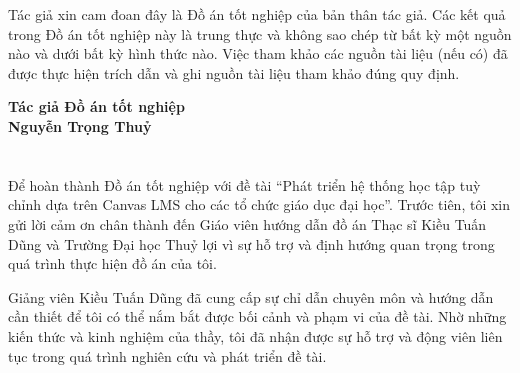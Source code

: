 \documentclass[a4paper,12pt,oneside]{report}
\title{\bf \TITLE}
\author{\AUTHOR}
\theoremstyle{definition}
\begin{document}
\restoregeometry

\restoregeometry

\newpage



\section*{}
\vspace{15pt}


Tác giả xin cam đoan đây là Đồ án tốt nghiệp của bản thân tác giả. Các kết quả trong Đồ án tốt nghiệp này là trung thực và không sao chép từ bất kỳ một nguồn nào và dưới bất kỳ hình thức nào. Việc tham khảo các nguồn tài liệu (nếu có) đã được thực hiện trích dẫn và ghi nguồn tài liệu tham khảo đúng quy định.
\begin{flushright}
  \textbf{Tác giả Đồ án tốt nghiệp}\\
  \vspace{2cm}
  \textbf{Nguyễn Trọng Thuỷ}
\end{flushright}

\pagestyle{empty} %

\newpage

\section*{}
\vspace{15pt}

Để hoàn thành Đồ án tốt nghiệp với đề tài “Phát triển hệ thống học tập tuỳ chỉnh dựa trên Canvas LMS cho các tổ chức giáo dục đại học”. Trước tiên, tôi xin gửi lời cảm ơn chân thành đến Giáo viên hướng dẫn đồ án Thạc sĩ Kiều Tuấn Dũng và Trường Đại học Thuỷ lợi vì sự hỗ trợ và định hướng quan trọng trong quá trình thực hiện đồ án của tôi.

Giảng viên Kiều Tuấn Dũng đã cung cấp sự chỉ dẫn chuyên môn và hướng dẫn cần thiết để tôi có thể nắm bắt được bối cảnh và phạm vi của đề tài. Nhờ những kiến thức và kinh nghiệm của thầy, tôi đã nhận được sự hỗ trợ và động viên liên tục trong quá trình nghiên cứu và phát triển đề tài.
\end{document}
